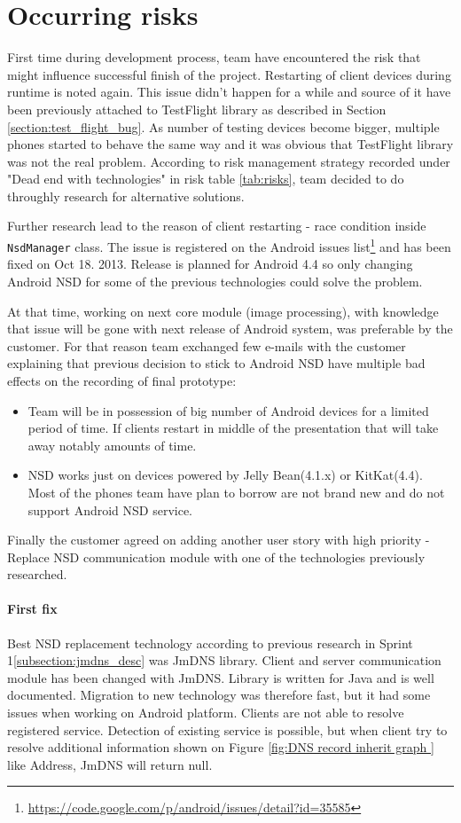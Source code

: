 \section{Occurring risks}
\label{sec:sprint5_occuring_risks}
First time during development process, team have encountered the risk that might influence successful finish of the project. 
Restarting of client devices during runtime is noted again. This issue didn't happen for a while and source of it have been previously attached to TestFlight library as described in Section \ref{section:test_flight_bug}. As number of testing devices become bigger, multiple phones started to behave the same way and it was obvious that TestFlight library was not the real problem. According to risk management strategy recorded under "Dead end with technologies" in risk table \ref{tab:risks}, team decided to do throughly research for alternative solutions. 

Further research lead to the reason of client restarting - race condition inside \texttt{NsdManager} class. The issue is registered on the Android issues list\footnote{\url{https://code.google.com/p/android/issues/detail?id=35585}} and has been fixed on Oct 18. 2013. Release is planned for Android 4.4 so only changing Android NSD for some of the previous technologies could solve the problem. 

At that time, working on next core module (image processing), with knowledge that issue will be gone with next release of Android system, was preferable by the customer. For that reason team exchanged few e-mails with the customer explaining that previous decision to stick to Android NSD have multiple bad effects on the recording of final prototype:
\begin{itemize}
\item Team will be in possession of big number of Android devices for a limited period of time. If clients restart in middle of the presentation that will take away notably amounts of time.

\item NSD works just on devices powered by Jelly Bean(4.1.x) or KitKat(4.4). Most of the phones team have plan to borrow are not brand new and do not support Android NSD service.
\end{itemize}

Finally the customer agreed on adding another user story with high priority - Replace NSD communication module with one of the technologies previously researched.

\paragraph{First fix}
Best NSD replacement technology according to previous research in Sprint 1\ref{subsection:jmdns_desc} was JmDNS library. 
Client and server communication module has been changed with JmDNS. Library is written for Java and is well documented.
Migration to new technology was therefore fast, but it had some issues when working on Android platform. Clients are not able to resolve registered service.
Detection of existing service is possible, but when client try to resolve additional information shown on Figure \ref{fig:DNS record inherit graph } like Address, JmDNS will return null.

